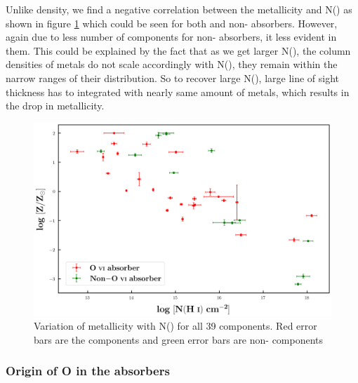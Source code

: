 Unlike density, we find a negative correlation between the metallicity and N() as shown in figure \ref{fig:Z-NHi} which could be seen for both  and non- absorbers. However, again due to less number of components for non- absorbers, it less evident in them. This could be explained by the fact that as we get larger N(), the column densities of metals do not scale accordingly with N(), they remain within the narrow ranges of their distribution. So to recover large N(), large line of sight thickness has to integrated with nearly same amount of metals, which results in the drop in metallicity.


\begin{figure}
    \centering
    \includegraphics[width=\linewidth]{Figures/Z_vs_NHi.png}
    \caption{Variation of metallicity with N() for all 39 components. Red error bars are the  components and green error bars are non- components}
    \label{fig:Z-NHi}
\end{figure}


\subsubsection{Origin of O \hspace*{-0.5mm}{\footnotesize VI} in the absorbers}

